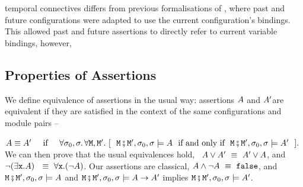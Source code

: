  temporal connectives 
differs from previous formalisations of \Chainmail  \cite{FASE}, where
 past and future configurations were adapted to use the current configuration's bindings. This allowed past and future assertions to directly refer to current variable bindings, however, 

\subsection{Properties of Assertions}

 
\label{sect:classical} 
We define equivalence of   assertions in the usual way: assertions $A$ and $A'$are equivalent if they are satisfied  in
the context of the same configurations and module pairs -- \ie\\
 \strut \hspace{1.1cm} $\A \equiv \A'\  \IFF\    \forall \sigma_0, \sigma.\, \forall \M, \M'. \ [\ \ \M\mkpair \M', \sigma_0,\sigma \models \A\ \mbox{ if and only if }\ \M\mkpair \M', \sigma_0,\sigma \models \A'\ \ ].$\\
We can then prove that the usual equivalences hold, \eg\  $ A \vee A' \ \equiv \  A' \vee A$, and\   $\neg (\exists {\mbox{\tt{x}}}.A )  \  \ \equiv \  \forall {\mbox{\tt{x}}}.(\neg  A)$.
%
Our assertions are classical, \eg  $ A \wedge\neg A \ \equiv \  {\mbox{\tt{false}}}$, and ${\mbox{\tt{\ensuremath{{\mbox{\tt{M}}}}}}}\fatsemi {\mbox{\tt{\ensuremath{{\mbox{\tt{M}}}}}}}', \sigma_0 , \sigma  \models A$ and  ${\mbox{\tt{\ensuremath{{\mbox{\tt{M}}}}}}}\fatsemi {\mbox{\tt{\ensuremath{{\mbox{\tt{M}}}}}}}', \sigma_0 , \sigma  \models A \rightarrow A'$  implies
${\mbox{\tt{\ensuremath{{\mbox{\tt{M}}}}}}}\fatsemi {\mbox{\tt{\ensuremath{{\mbox{\tt{M}}}}}}}', \sigma_0 , \sigma  \models A '$. 





